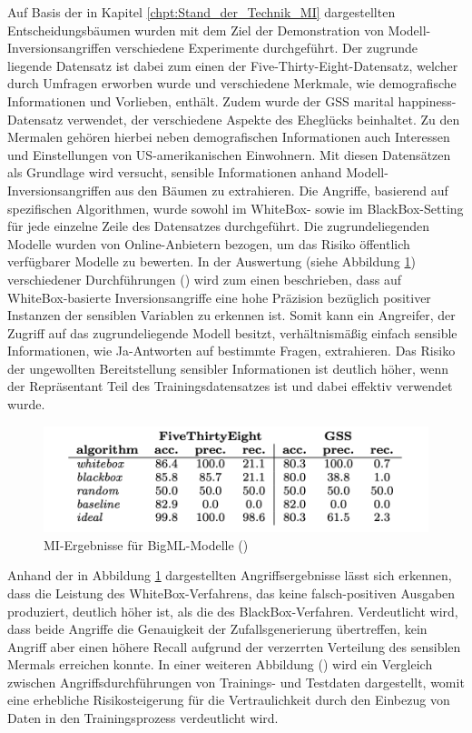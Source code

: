 Auf Basis der in Kapitel \ref{chpt:Stand_der_Technik_MI} dargestellten Entscheidungsbäumen wurden mit dem Ziel der Demonstration von Modell-Inversionsangriffen verschiedene Experimente durchgeführt. Der zugrunde liegende Datensatz ist dabei zum einen der \glqq Five-Thirty-Eight\grqq{}-Datensatz, welcher durch Umfragen erworben wurde und verschiedene Merkmale, wie demografische Informationen und Vorlieben, enthält. Zudem wurde der \glqq GSS marital happiness\grqq{}-Datensatz verwendet, der verschiedene Aspekte des Eheglücks beinhaltet. Zu den Mermalen gehören hierbei neben demografischen Informationen auch Interessen und Einstellungen von US-amerikanischen Einwohnern. Mit diesen Datensätzen als Grundlage wird versucht, sensible Informationen anhand Modell-Inversionsangriffen aus den Bäumen zu extrahieren. Die Angriffe, basierend auf spezifischen Algorithmen, wurde sowohl im WhiteBox- sowie im BlackBox-Setting für jede einzelne Zeile des Datensatzes durchgeführt. Die zugrundeliegenden Modelle wurden von \glqq Online-Anbietern\grqq{} bezogen, um das Risiko öffentlich verfügbarer Modelle zu bewerten. In der Auswertung (siehe Abbildung \ref{img:frederikson_2015_evaluation}) verschiedener Durchführungen (\cite[S. 5 ff.]{fredrikson_model_2015}) wird zum einen beschrieben, dass auf WhiteBox-basierte Inversionsangriffe eine hohe Präzision bezüglich positiver Instanzen der sensiblen Variablen zu erkennen ist. Somit kann ein Angreifer, der Zugriff auf das zugrundeliegende Modell besitzt, verhältnismäßig einfach sensible Informationen, wie \glqq Ja\grqq{}-Antworten auf bestimmte Fragen, extrahieren. Das Risiko der \glqq ungewollten Bereitstellung\grqq{} sensibler Informationen ist deutlich höher, wenn der Repräsentant Teil des Trainingsdatensatzes ist und dabei effektiv verwendet wurde. 
\begin{figure}[H]
	\centering
	\includegraphics[width=0.8\linewidth]{Bilder/frederikson_2015_1.png}
	\caption{MI-Ergebnisse für BigML-Modelle (\cite[S. 6, Figure 4]{fredrikson_model_2015})}
	\label{img:frederikson_2015_evaluation}
\end{figure}
Anhand der in Abbildung \ref{img:frederikson_2015_evaluation} dargestellten Angriffsergebnisse lässt sich erkennen, dass die Leistung des WhiteBox-Verfahrens, das keine falsch-positiven Ausgaben produziert, deutlich höher ist, als die des BlackBox-Verfahren. Verdeutlicht wird, dass beide Angriffe die Genauigkeit der Zufallsgenerierung übertreffen, kein Angriff aber einen höhere Recall aufgrund der verzerrten Verteilung des sensiblen Mermals erreichen konnte. In einer weiteren Abbildung (\cite[S. 7, Figure 5]{fredrikson_model_2015}) wird ein Vergleich zwischen Angriffsdurchführungen von Trainings- und Testdaten dargestellt, womit eine erhebliche Risikosteigerung für die Vertraulichkeit durch den Einbezug von Daten in den Trainingsprozess verdeutlicht wird. 

